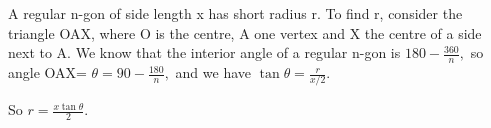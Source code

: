 A regular n-gon of side length x has short radius r. To find r,
consider the triangle OAX, where O is the centre, A one vertex 
and X the centre of a side next to A. We know that the interior
angle of a regular n-gon is $ 180 - \frac{360}{n}, $ so
angle OAX= $ \theta = 90 - \frac{180}{n} , $
and we have $ \tan \theta = \frac{r}{x/2} . $
\par
So $ r = \frac{x \tan \theta }{2} . $
